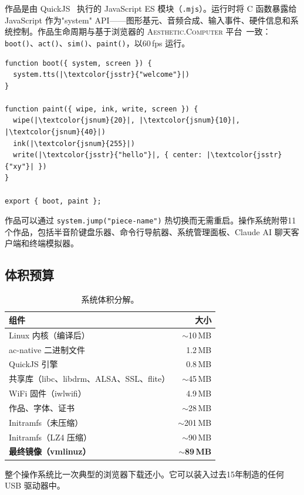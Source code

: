 \documentclass[10pt,letterpaper,twocolumn]{article}
\newcommand{\ac}{\textsc{Aesthetic.Computer}}
\begin{document}
作品是由 QuickJS~\citep{bellard2005quickjs} 执行的 JavaScript ES 模块（\texttt{.mjs}）。运行时将 C 函数暴露给 JavaScript 作为"system" API——图形基元、音频合成、输入事件、硬件信息和系统控制。作品生命周期与基于浏览器的 \ac{} 平台~\citep{scudder2026ac}一致：\texttt{boot()}、\texttt{act()}、\texttt{sim()}、\texttt{paint()}，以60\,fps 运行。

\begin{lstlisting}[style=acjsstyle]
function boot({ system, screen }) {
  system.tts(|\textcolor{jsstr}{"welcome"}|)
}

function paint({ wipe, ink, write, screen }) {
  wipe(|\textcolor{jsnum}{20}|, |\textcolor{jsnum}{10}|, |\textcolor{jsnum}{40}|)
  ink(|\textcolor{jsnum}{255}|)
  write(|\textcolor{jsstr}{"hello"}|, { center: |\textcolor{jsstr}{"xy"}| })
}

export { boot, paint };
\end{lstlisting}

作品可以通过 \texttt{system.jump("piece-name")} 热切换而无需重启。操作系统附带11个作品，包括半音阶键盘乐器、命令行导航器、系统管理面板、Claude AI 聊天客户端和终端模拟器。

\subsection{体积预算}

\begin{table}[h]
\small
\centering
\begin{tabular}{lr}
\toprule
\textbf{组件} & \textbf{大小} \\
\midrule
Linux 内核（编译后） & $\sim$10\,MB \\
ac-native 二进制文件 & 1.2\,MB \\
QuickJS 引擎 & 0.8\,MB \\
共享库（libc、libdrm、ALSA、SSL、flite） & $\sim$45\,MB \\
WiFi 固件（iwlwifi） & 4.9\,MB \\
作品、字体、证书 & $\sim$28\,MB \\
\midrule
Initramfs（未压缩） & $\sim$201\,MB \\
Initramfs（LZ4 压缩） & $\sim$90\,MB \\
\textbf{最终镜像（vmlinuz）} & \textbf{$\sim$89\,MB} \\
\bottomrule
\end{tabular}
\caption{系统体积分解。}
\label{tab:size}
\end{table}

整个操作系统比一次典型的浏览器下载还小。它可以装入过去15年制造的任何 USB 驱动器中。
\end{document}
